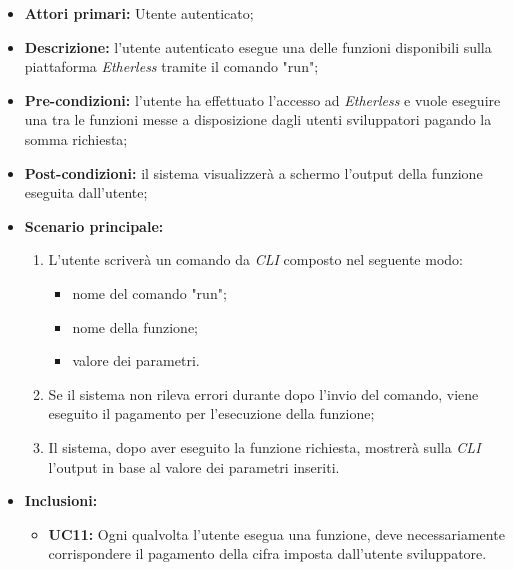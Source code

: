 \begin{itemize}
	\item \textbf{Attori primari:} Utente autenticato;
	\item \textbf{Descrizione:} l'utente autenticato esegue una delle funzioni disponibili sulla piattaforma \textit{Etherless} tramite il comando "run"; 
	\item \textbf{Pre-condizioni:} l'utente ha effettuato l'accesso ad \textit{Etherless} e vuole eseguire una tra le funzioni messe a disposizione dagli utenti sviluppatori pagando la somma richiesta;
	\item \textbf{Post-condizioni:} il sistema visualizzerà a schermo l'output della funzione eseguita dall'utente;
	\item \textbf{Scenario principale:} 
	\begin{enumerate}
		\item L'utente scriverà un comando da \textit{CLI\glo} composto nel seguente modo:
		\begin{itemize}
			\item nome del comando "run";
			\item nome della funzione;
			\item valore dei parametri.
		\end{itemize}
		\item Se il sistema non rileva errori durante dopo l'invio del comando, viene eseguito il pagamento per l'esecuzione della funzione;
		\item Il sistema, dopo aver eseguito la funzione richiesta, mostrerà sulla \textit{CLI\glo} l'output in base al valore dei parametri inseriti.
	\end{enumerate}
	\item \textbf{Inclusioni:} 
	\begin{itemize}
		\item \textbf{UC11:} Ogni qualvolta l'utente esegua una funzione, deve necessariamente corrispondere il pagamento della cifra imposta dall'utente sviluppatore.
	\end{itemize}
\end{itemize}